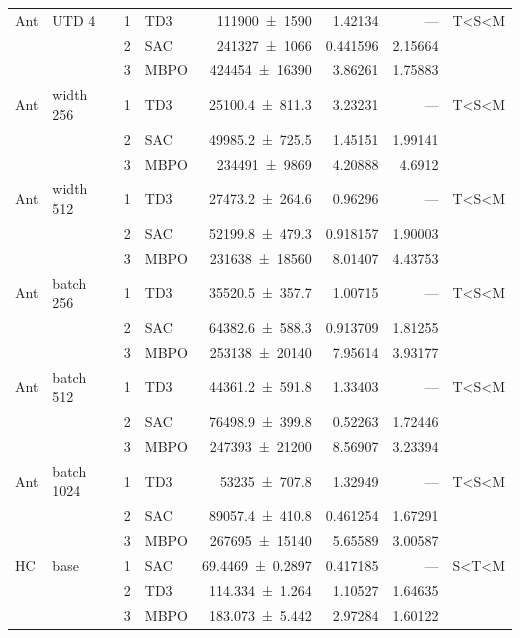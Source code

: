 {\begin{longtable}{@{}llrlrrrl@{}}
    Ant & UTD 4 & \num{1} & TD3 & \num{111900+-1590} & \num{1.42134} & --- & T<S<M \\
     &  & \num{2} & SAC & \num{241327+-1066} & \num{0.441596} & \num{2.15664} &  \\
     &  & \num{3} & MBPO & \num{424454+-16390} & \num{3.86261} & \num{1.75883} &  \\
    Ant & width 256 & \num{1} & TD3 & \num{25100.4+-811.3} & \num{3.23231} & --- & T<S<M \\
     &  & \num{2} & SAC & \num{49985.2+-725.5} & \num{1.45151} & \num{1.99141} &  \\
     &  & \num{3} & MBPO & \num{234491+-9869} & \num{4.20888} & \num{4.6912} &  \\
    Ant & width 512 & \num{1} & TD3 & \num{27473.2+-264.6} & \num{0.96296} & --- & T<S<M \\
     &  & \num{2} & SAC & \num{52199.8+-479.3} & \num{0.918157} & \num{1.90003} &  \\
     &  & \num{3} & MBPO & \num{231638+-18560} & \num{8.01407} & \num{4.43753} &  \\
    Ant & batch 256 & \num{1} & TD3 & \num{35520.5+-357.7} & \num{1.00715} & --- & T<S<M \\
     &  & \num{2} & SAC & \num{64382.6+-588.3} & \num{0.913709} & \num{1.81255} &  \\
     &  & \num{3} & MBPO & \num{253138+-20140} & \num{7.95614} & \num{3.93177} &  \\
    Ant & batch 512 & \num{1} & TD3 & \num{44361.2+-591.8} & \num{1.33403} & --- & T<S<M \\
     &  & \num{2} & SAC & \num{76498.9+-399.8} & \num{0.52263} & \num{1.72446} &  \\
     &  & \num{3} & MBPO & \num{247393+-21200} & \num{8.56907} & \num{3.23394} &  \\
    Ant & batch 1024 & \num{1} & TD3 & \num{53235+-707.8} & \num{1.32949} & --- & T<S<M \\
     &  & \num{2} & SAC & \num{89057.4+-410.8} & \num{0.461254} & \num{1.67291} &  \\
     &  & \num{3} & MBPO & \num{267695+-15140} & \num{5.65589} & \num{3.00587} &  \\
    \midrule
    HC & base & \num{1} & SAC & \num{69.4469+-0.2897} & \num{0.417185} & --- & S<T<M \\
     &  & \num{2} & TD3 & \num{114.334+-1.264} & \num{1.10527} & \num{1.64635} &  \\
     &  & \num{3} & MBPO & \num{183.073+-5.442} & \num{2.97284} & \num{1.60122} &  \\

\end{longtable}}
